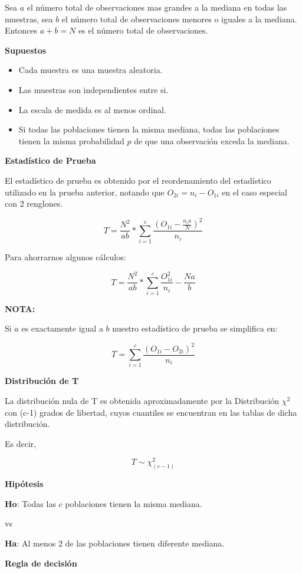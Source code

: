 \documentclass[a4paper,oneside,openany]{book}
\begin{document}
Sea \(a\) el número total de observaciones mas grandes a la mediana en
todas las muestras, sea \(b\) el número total de observaciones menores o
iguales a la mediana. Entonces \(a+b=N\) es el número total de
observaciones.

\textbf{Supuestos}

\begin{itemize}
\item
  Cada muestra es una muestra aleatoria.
\item
  Las muestras son independientes entre si.
\item
  La escala de medida es al menos ordinal.
\item
  Si todas las poblaciones tienen la misma mediana, todas las
  poblaciones tienen la misma probabilidad \(p\) de que una observación
  exceda la mediana.
\end{itemize}

\textbf{Estadístico de Prueba}

El estadístico de prueba es obtenido por el reordenamiento del
estadístico utilizado en la prueba anterior, notando que
\(O_{2i}=n_{i}-O_{1i}\) en el caso especial con 2 renglones.

\[T=\frac{N^2}{ab}*\sum^{c}_{i=1}\frac{(O_{1i}-\frac{n_{i}a}{N})^2}{n_i}\]

Para ahorrarnos algunos cálculos:

\[T=\frac{N^2}{ab}*\sum^{c}_{i=1}\frac{O_{1i}^2}{n_i}-\frac{Na}{b}\]

\textbf{NOTA:}

Si \(a\) es exactamente igual a \(b\) nuestro estadístico de prueba se
simplifica en:

\[T=\sum^{c}_{i=1}\frac{(O_{1i}-O_{2i})^2}{n_i}\]

\textbf{Distribución de T}

La distribución nula de T es obtenida aproximadamente por la
Distribución \(\chi^2\) con (c-1) grados de libertad, cuyos cuantiles se
encuentran en las tablas de dicha distribución.

Es decir,

\[T\sim \chi^2_{(c-1)}\]

\textbf{Hipótesis}

\textbf{Ho}: Todas las \(c\) poblaciones tienen la misma mediana.

vs

\textbf{Ha}: Al menos 2 de las poblaciones tienen diferente mediana.

\textbf{Regla de decisión}
\end{document}
